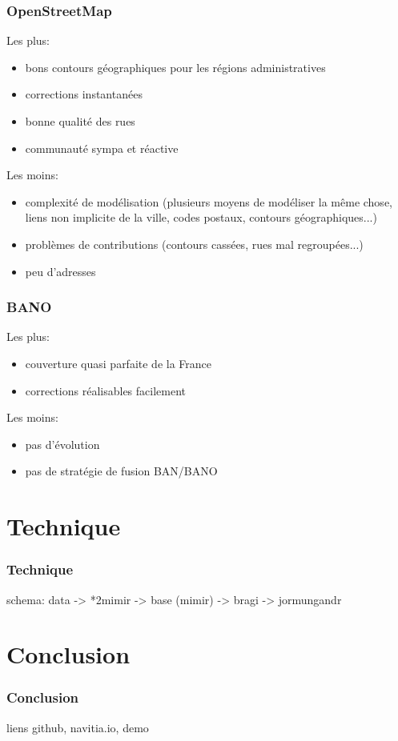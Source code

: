 \documentclass[table]{beamer}
\begin{document}
\begin{frame}
  \frametitle{OpenStreetMap}

  Les plus:
  \begin{itemize}
  \item bons contours géographiques pour les régions administratives
  \item corrections instantanées
  \item bonne qualité des rues
  \item communauté sympa et réactive
  \end{itemize}

  Les moins:
  \begin{itemize}
  \item complexité de modélisation (plusieurs moyens de modéliser la
    même chose, liens non implicite de la ville, codes postaux,
    contours géographiques...)
  \item problèmes de contributions (contours cassées, rues mal regroupées...)
  \item peu d'adresses
  \end{itemize}
\end{frame}

\begin{frame}
  \frametitle{BANO}

  Les plus:
  \begin{itemize}
  \item couverture quasi parfaite de la France
  \item corrections réalisables facilement
  \end{itemize}

  Les moins:
  \begin{itemize}
  \item pas d'évolution
  \item pas de stratégie de fusion BAN/BANO
  \end{itemize}
\end{frame}

\section{Technique}

\begin{frame}
  \frametitle{Technique}

  schema: data -> *2mimir -> base (mimir) -> bragi -> jormungandr
\end{frame}

\section{Conclusion}

\begin{frame}
  \frametitle{Conclusion}

  liens github, navitia.io, demo
\end{frame}

\begin{frame}
  \titlepage
\end{frame}
\end{document}
